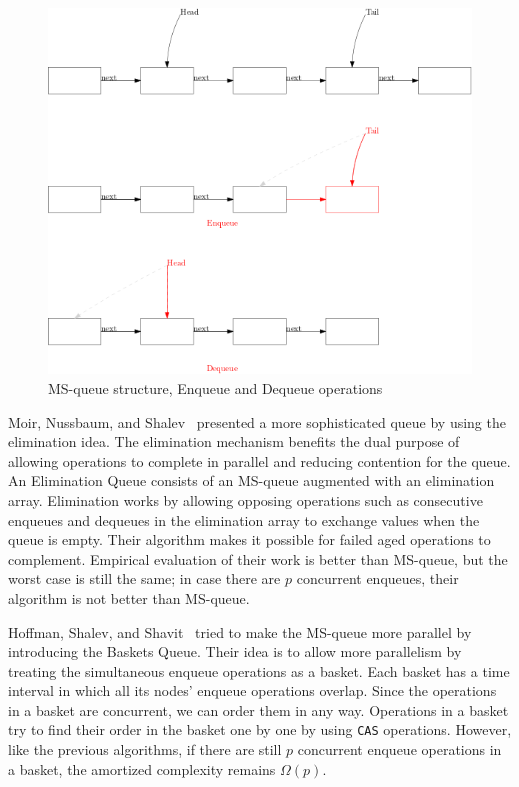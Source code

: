 \documentclass[12pt]{article}
\begin{document}
\begin{figure}[hbt]
  \center\includegraphics[scale=0.5]{pics/msqueue}
  \caption{MS-queue structure, Enqueue and Dequeue operations}
\end{figure}


Moir, Nussbaum, and Shalev~\cite{DBLP:conf/spaa/MoirNSS05} presented a more sophisticated queue by using the elimination idea. The elimination mechanism benefits the dual purpose of allowing operations to complete in parallel and reducing contention for the queue. An Elimination Queue consists of an MS-queue augmented with an elimination array. Elimination works by allowing opposing operations such as consecutive enqueues and dequeues  in the elimination array to exchange values when the queue is empty. Their algorithm makes it possible for failed aged operations to complement. Empirical evaluation of their work is better than MS-queue, but the worst case is still the same; in case there are $p$ concurrent enqueues, their algorithm is not better than MS-queue. 


Hoffman, Shalev, and Shavit~\cite{DBLP:conf/opodis/HoffmanSS07} tried to make the MS-queue more parallel by introducing the Baskets Queue. Their idea is to allow more parallelism by treating the simultaneous enqueue operations as a basket. Each basket has a time interval in which all its nodes’ enqueue operations overlap. Since the operations in a basket are concurrent, we can order them in any way. Operations in a basket try to find their order in the basket one by one by using \texttt{CAS} operations. However, like the previous algorithms, if there are still $p$ concurrent enqueue operations in a basket, the amortized complexity remains $\Omega(p)$.
\end{document}
